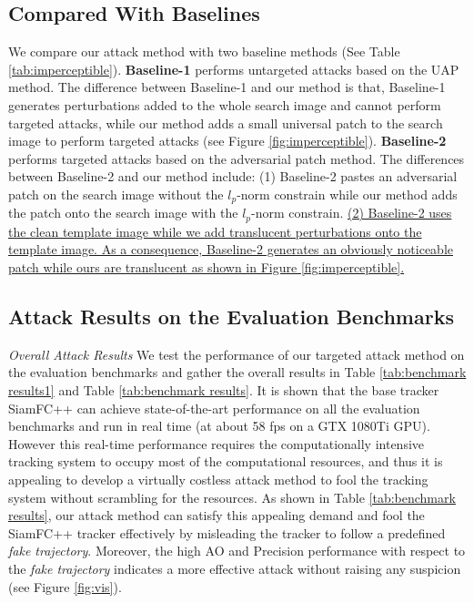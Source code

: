 \documentclass[journal]{IEEEtran}
\begin{document}
\subsection{Compared With Baselines}

We compare our attack method with two baseline methods (See Table \ref{tab:imperceptible}).
\textbf{Baseline-1} performs untargeted attacks based on the UAP \cite{UAP} method. The difference between Baseline-1 and our method is that, Baseline-1 generates perturbations added to the whole search image and cannot perform targeted attacks, while our method adds a small universal patch to the search image to perform targeted attacks (see Figure \ref{fig:imperceptible}).
\textbf{Baseline-2} performs targeted attacks based on the adversarial patch \cite{patch} method. The differences between Baseline-2 and our method include: (1) Baseline-2 pastes an adversarial patch on the search image without the $l_p\text{-norm}$ constrain while our method adds the patch onto the search image with the $l_p\text{-norm}$ constrain. 
\uline{
(2) Baseline-2 uses the clean template image while we add translucent perturbations onto the template image. As a consequence, Baseline-2 generates an obviously noticeable patch while ours are translucent as shown in Figure \ref{fig:imperceptible}.
}

\subsection{Attack Results on the Evaluation Benchmarks}

\textit{Overall Attack Results} We test the performance of our targeted attack method on the evaluation benchmarks and gather the overall results in Table \ref{tab:benchmark results1} and Table \ref{tab:benchmark results}. It is shown that the base tracker SiamFC++ can achieve state-of-the-art performance on all the evaluation benchmarks and run in real time (at about 58 fps on a GTX 1080Ti GPU). However this real-time performance requires the computationally intensive tracking system to occupy most of the computational resources, and thus it is appealing to develop a virtually costless attack method to fool the tracking system without scrambling for the resources. As shown in Table \ref{tab:benchmark results}, our attack method can satisfy this appealing demand and fool the SiamFC++ tracker effectively by misleading the tracker to follow a predefined \textit{fake trajectory}. Moreover, the high AO and Precision performance with respect to the \textit{fake trajectory} indicates a more effective attack without raising any suspicion (see Figure \ref{fig:vis}).
\end{document}
